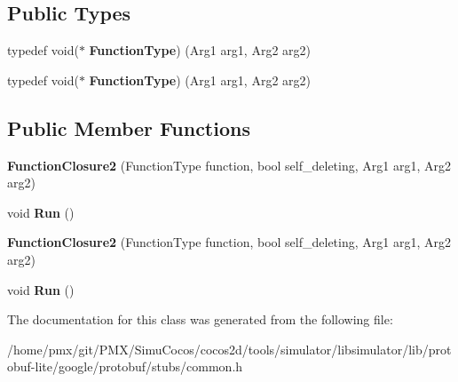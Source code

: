 \subsection*{Public Types}
\begin{DoxyCompactItemize}
\item 
\mbox{\label{classgoogle_1_1protobuf_1_1internal_1_1FunctionClosure2_a27f19a2906167b26dbee1df9d97a5fe2}} 
typedef void($\ast$ {\bfseries Function\+Type}) (Arg1 arg1, Arg2 arg2)
\item 
\mbox{\label{classgoogle_1_1protobuf_1_1internal_1_1FunctionClosure2_a27f19a2906167b26dbee1df9d97a5fe2}} 
typedef void($\ast$ {\bfseries Function\+Type}) (Arg1 arg1, Arg2 arg2)
\end{DoxyCompactItemize}
\subsection*{Public Member Functions}
\begin{DoxyCompactItemize}
\item 
\mbox{\label{classgoogle_1_1protobuf_1_1internal_1_1FunctionClosure2_aea305d398de10c69f8b48faf7eaa13f6}} 
{\bfseries Function\+Closure2} (Function\+Type function, bool self\+\_\+deleting, Arg1 arg1, Arg2 arg2)
\item 
\mbox{\label{classgoogle_1_1protobuf_1_1internal_1_1FunctionClosure2_a6a4304f6e933507e2cb6161b8f7333b5}} 
void {\bfseries Run} ()
\item 
\mbox{\label{classgoogle_1_1protobuf_1_1internal_1_1FunctionClosure2_aea305d398de10c69f8b48faf7eaa13f6}} 
{\bfseries Function\+Closure2} (Function\+Type function, bool self\+\_\+deleting, Arg1 arg1, Arg2 arg2)
\item 
\mbox{\label{classgoogle_1_1protobuf_1_1internal_1_1FunctionClosure2_a6a4304f6e933507e2cb6161b8f7333b5}} 
void {\bfseries Run} ()
\end{DoxyCompactItemize}


The documentation for this class was generated from the following file\+:\begin{DoxyCompactItemize}
\item 
/home/pmx/git/\+P\+M\+X/\+Simu\+Cocos/cocos2d/tools/simulator/libsimulator/lib/protobuf-\/lite/google/protobuf/stubs/common.\+h\end{DoxyCompactItemize}
